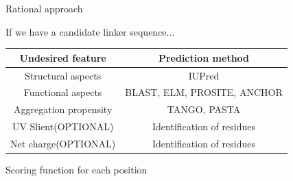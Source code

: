\documentclass{beamer}
\begin{document}
\begin{frame}{Rational approach}
 
If we have a candidate linker sequence...
 
\vspace{5px}
\begin{tabular}{c|c}
Undesired feature & Prediction method \\ \hline
Structural aspects & IUPred  \\
Functional aspects & BLAST, ELM, PROSITE, ANCHOR \\  
Aggregation propensity & TANGO, PASTA   \\
UV Slient(OPTIONAL) & Identification of residues \\
Net charge(OPTIONAL)& Identification of residues\\
\end{tabular}
 
 

Scoring function for each position 
 




  



\end{frame}


% 
% 
\end{document}
